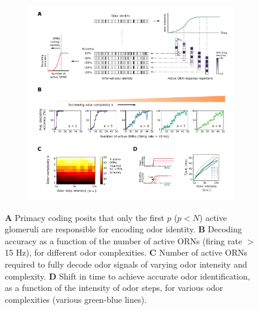 \documentclass[9pt,twocolumn,twoside,lineno]{pnas-new}
\begin{document}
\begin{figure}[!tb]
	\begin{subfigure}[t]{\linewidth}
		\includegraphics[width=\textwidth]{figures/5_primacy_coding}
		\label{fig:primacy_coding_a}	
	\end{subfigure}
	\begin{subfigure}[t]{0\linewidth}
		\label{fig:primacy_coding_b}
	\end{subfigure}
	\begin{subfigure}[t]{0\linewidth}
		\label{fig:primacy_coding_c}
	\end{subfigure}
	\begin{subfigure}[t]{0\linewidth}
		\label{fig:primacy_coding_d}
	\end{subfigure}
	\caption{\footnotesize{\textbf{A} Primacy coding posits that only the first $p$ ($p < N$) active glomeruli are responsible for encoding odor identity. \textbf{B} Decoding accuracy as a function of the number of active ORNs (firing rate $>$ 15 Hz), for different odor complexities. \textbf{C} Number of active ORNs required to fully decode odor signals of varying odor intensity and complexity. \textbf{D} Shift in time to achieve accurate odor identification, as a function of the intensity of odor steps, for various odor complexities (various green-blue lines).
	}}
	\label{fig:primacy_coding}
\end{figure}
\end{document}
